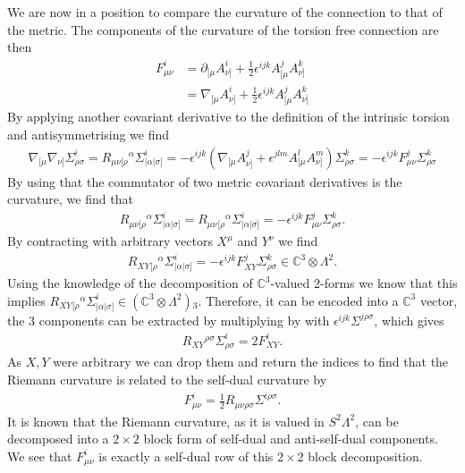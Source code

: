 \documentclass[10pt]{report}
\theoremstyle{definition}
\newcommand{\C}[0]{\mathbb{C}}
\newcommand{\E}[0]{\C^3}
\begin{document}
We are now in a position to compare the curvature of the connection to that of the metric. The components of the curvature of the torsion free connection are then 
\begin{align}
    F^i_{\mu\nu} & = \partial_{[\mu} A^i_{\nu]} + \frac{1}{2}\epsilon^{ijk} A^j_{[\mu} A^k_{\nu]} \\
                 & = \nabla_{[\mu} A^i_{\nu]} + \frac{1}{2}\epsilon^{ijk} A^j_{[\mu} A^k_{\nu]}
\end{align}
By applying another covariant derivative to the definition of the intrinsic torsion and antisymmetrising we find 
\begin{align}
    \nabla_{[\mu} \nabla_{\nu]} \Sigma^i_{\rho\sigma} = R_{\mu\nu[\rho}{}^\alpha \Sigma^i_{|\alpha|\sigma]} = - \epsilon^{ijk} \left( \nabla_{[\mu} A^j_{\nu]} + \epsilon^{jlm} A^l_{[\mu} A^m_{\nu]} \right) \Sigma^k_{\rho\sigma} = -\epsilon^{ijk} F^j_{\mu\nu} \Sigma^k_{\rho\sigma}
\end{align}
By using that the commutator of two metric covariant derivatives is the curvature, we find that
\begin{align}
    R_{\mu\nu[\rho}{}^\alpha \Sigma^i_{|\alpha|\sigma]} = R_{\mu\nu}{}_{[\rho}{}^\alpha \Sigma^i_{|\alpha|\sigma]} = -\epsilon^{ijk} F^j_{\mu\nu} \Sigma^k_{\rho\sigma}.
\end{align} 
By contracting with arbitrary vectors $X^\mu$ and $Y^\nu$ we find
\begin{align}
    R_{XY}{}_{[\rho}{}^{\alpha} \Sigma^i_{|\alpha|\sigma]} = - \epsilon^{ijk} F^j_{XY} \Sigma^k_{\rho\sigma} \in \E \otimes \Lambda^2.
\end{align}
Using the knowledge of the decomposition of $\E$-valued 2-forms we know that this implies $R_{XY}{}_{[\rho}{}^\alpha \Sigma^i_{|\alpha|\sigma]} \in (\E \otimes \Lambda^2){}_3$. Therefore, it can be encoded into a $\E$ vector, the 3 components can be extracted by multiplying by with $\epsilon^{ijk} \Sigma^{j\rho\sigma}$, which gives
\begin{align}
    R_{XY}{}^{\rho\sigma} \Sigma^i_{\rho\sigma} = 2 F^i_{XY}.
\end{align}
As $X,Y$ were arbitrary we can drop them and return the indices to find that the Riemann curvature is related to the self-dual curvature by
\begin{align}
    F^i_{\mu\nu} = \frac{1}{2} R_{\mu\nu\rho\sigma} \Sigma^{i\rho\sigma}.
\end{align}
It is known that the Riemann curvature, as it is valued in $S^2 \Lambda^2$, can be decomposed into a $2 \times 2$ block form of self-dual and anti-self-dual components. We see that $F^i_{\mu\nu}$ is exactly a self-dual row of this $2 \times 2$ block decomposition.
\end{document}
